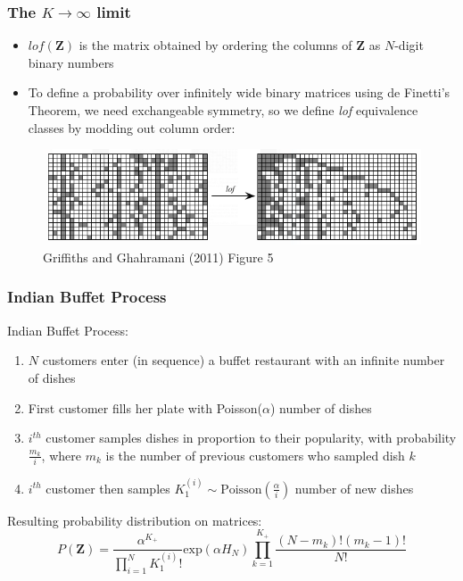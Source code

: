 \documentclass[13pt]{beamer}
\begin{document}
\begin{frame}
\frametitle{The $K \rightarrow \infty$ limit}
\begin{itemize}
\item $lof(\mathbf{Z})$ is the matrix obtained by ordering the columns of $\mathbf{Z}$ as $N$-digit binary numbers
\item To define a probability over infinitely wide binary matrices using de Finetti's Theorem,
we need exchangeable symmetry, so we define \emph{lof} equivalence classes by modding out column order:
\end{itemize}

\begin{figure}
\begin{center}
\includegraphics[scale=0.5]{./img/ibp-sorted.png}
\caption{Griffiths and Ghahramani (2011) Figure 5}
\end{center}
\end{figure}
\end{frame}
\begin{frame}
\frametitle{Indian Buffet Process}

Indian Buffet Process:
\begin{enumerate}
\item $N$ customers enter (in sequence) a buffet restaurant with an infinite number of dishes
\item First customer fills her plate with Poisson($\alpha$) number of dishes
\item $i^{th}$ customer samples dishes in proportion to their popularity, with probability $\frac{m_k}{i}$, where $m_k$ is the number of previous customers who sampled dish $k$
\item $i^{th}$ customer then samples $K^{(i)}_1 \sim \text{Poisson}(\frac{\alpha}{i})$ number of new dishes
\end{enumerate}
\bigskip
Resulting probability distribution on matrices: $$P(\mathbf{Z}) = \frac{\alpha^{K_+}}{\prod_{i=1}^N K^{(i)}_1 ! } \text{exp}(\alpha H_N) \prod_{k=1}^{K_+} \frac{(N - m_k)! (m_k - 1)!}{N!} $$
\end{frame}
\end{document}
